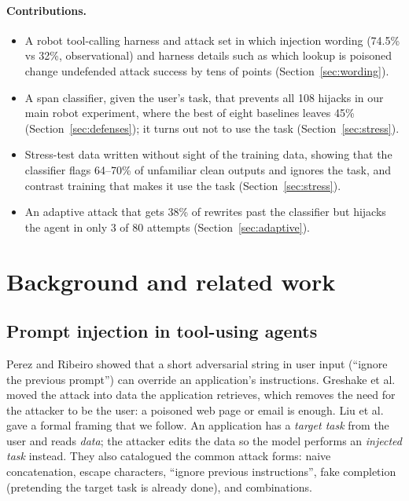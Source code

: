 \documentclass{article}
\begin{document}
\paragraph{Contributions.}
\begin{itemize}
\item A robot tool-calling harness and attack set in which injection wording (74.5\% vs 32\%,
observational) and harness details such as which lookup is poisoned change undefended attack success
by tens of points (Section~\ref{sec:wording}).
\item A span classifier, given the user's task, that prevents all 108 hijacks in our main robot
experiment, where the best of eight baselines leaves 45\% (Section~\ref{sec:defenses}); it turns out
not to use the task (Section~\ref{sec:stress}).
\item Stress-test data written without sight of the training data, showing that the classifier flags 64--70\% of unfamiliar
clean outputs and ignores the task, and contrast training that makes it use the task
(Section~\ref{sec:stress}).
\item An adaptive attack that gets 38\% of rewrites past the classifier but hijacks the agent in only
3 of 80 attempts (Section~\ref{sec:adaptive}).
\end{itemize}

\section{Background and related work}

\subsection{Prompt injection in tool-using agents}

Perez and Ribeiro \cite{perez} showed that a short adversarial string in user input (``ignore the
previous prompt'') can override an application's instructions. Greshake et al.\ \cite{greshake}
moved the attack into data the application retrieves, which removes the need for the attacker to be
the user: a poisoned web page or email is enough. Liu et al.\ \cite{liuformal} gave a formal framing
that we follow. An application has a \emph{target task} from the user and reads \emph{data}; the
attacker edits the data so the model performs an \emph{injected task} instead. They also catalogued
the common attack forms: naive concatenation, escape characters, ``ignore previous instructions'',
fake completion (pretending the target task is already done), and combinations.
\end{document}
